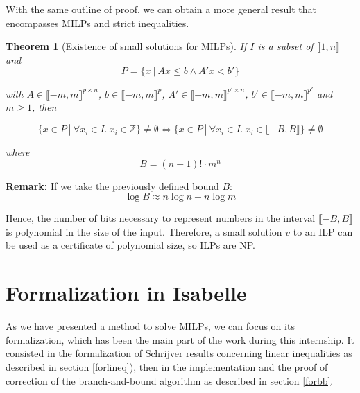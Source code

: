 \documentclass{article}
\newcommand{\ints}{\mathbb{Z}}
\newtheorem{theorem}{Theorem}
\begin{document}
With the same outline of proof, we can obtain a more general result that
encompasses MILPs and strict inequalities. 

\begin{theorem}[Existence of small solutions for MILPs]
  \label{small-milp}
  If $I$ is a subset of $\llbracket 1, n \rrbracket$ and
  $$P = \{x~|~Ax \leqslant b \wedge A'x < b'\}$$
  
  with
  $A \in \llbracket -m, m \rrbracket^{p \times n}$,
  $b \in \llbracket -m, m \rrbracket^p$,
  $A' \in \llbracket -m, m \rrbracket^{p' \times n}$,
  $b' \in \llbracket -m, m \rrbracket^{p'}$ and $m \geqslant 1$, then

  $$\{x \in P~|~\forall x_i \in I.~x_i \in \ints\} \neq \emptyset
      \Longleftrightarrow
    \{x \in P~|~\forall x_i \in I.~x_i \in \llbracket -B, B \rrbracket\}
      \neq \emptyset$$

  where
  $$B = (n + 1)! \cdot m^n$$
\end{theorem}

\textbf{Remark:} If we take the previously defined bound $B$:
$$\log B \approx n \log n + n \log m$$

Hence, the number of bits
necessary to represent numbers in the interval $\llbracket -B, B \rrbracket$
is polynomial in the size of the input. Therefore, a small solution $v$ to
an ILP can be used as a certificate of polynomial size, so ILPs are NP.

\pagebreak

\section{Formalization in Isabelle}
\label{secformalization}

As we have presented a method to solve MILPs, we can focus on its
formalization, which has been the main part of the work during this internship.
It consisted in the formalization of Schrijver results concerning linear
inequalities as described in section \ref{forlineq}), then in the
implementation and the proof of correction of the branch-and-bound algorithm
as described in section \ref{forbb}.
\end{document}

